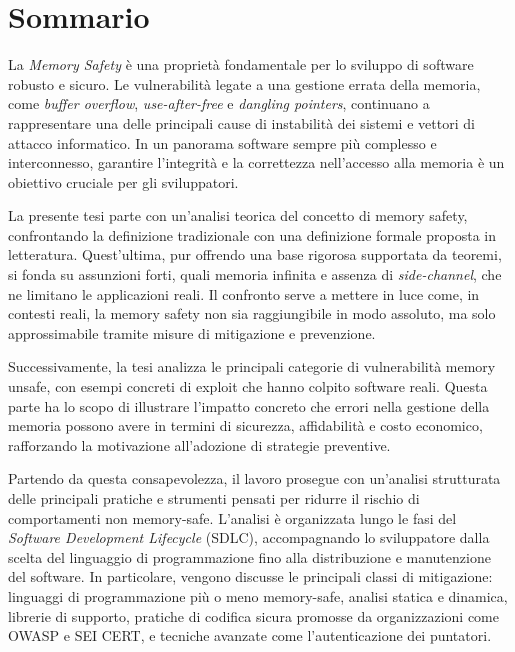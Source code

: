 \chapter*{Sommario}
\label{cha:sommario}

\vspace{0.5em}

La \textit{Memory Safety} è una proprietà fondamentale per lo sviluppo di software
robusto e sicuro. Le vulnerabilità legate a una gestione errata della memoria, come
\textit{buffer overflow}, \textit{use-after-free} e \textit{dangling pointers},
continuano a rappresentare una delle principali cause di instabilità dei sistemi
e vettori di attacco informatico. In un panorama software sempre più complesso e
interconnesso, garantire l'integrità e la correttezza nell'accesso alla memoria
è un obiettivo cruciale per gli sviluppatori.

\vspace{0.25em}

La presente tesi parte con un'analisi teorica del concetto di memory safety,
confrontando la definizione tradizionale con una definizione formale proposta in
letteratura. Quest'ultima, pur offrendo una base rigorosa supportata da teoremi,
si fonda su assunzioni forti, quali memoria infinita e assenza di \textit{side-channel},
che ne limitano le applicazioni reali. Il confronto serve a mettere in luce come,
in contesti reali, la memory safety non sia raggiungibile in modo assoluto, ma solo
approssimabile tramite misure di mitigazione e prevenzione.

\vspace{0.25em}

Successivamente, la tesi analizza le principali categorie di vulnerabilità
memory unsafe, con esempi concreti di exploit che hanno colpito software reali.
Questa parte ha lo scopo di illustrare l'impatto concreto che errori nella
gestione della memoria possono avere in termini di sicurezza, affidabilità e costo
economico, rafforzando la motivazione all'adozione di strategie preventive.

\vspace{0.25em}

Partendo da questa consapevolezza, il lavoro prosegue con un'analisi strutturata
delle principali pratiche e strumenti pensati per ridurre il rischio di
comportamenti non memory-safe. L'analisi è organizzata lungo le fasi del \textit{Software
Development Lifecycle} (SDLC), accompagnando lo sviluppatore dalla scelta del linguaggio
di programmazione fino alla distribuzione e manutenzione del software. In
particolare, vengono discusse le principali classi di mitigazione: linguaggi di
programmazione più o meno memory-safe, analisi statica e dinamica, librerie di
supporto, pratiche di codifica sicura promosse da organizzazioni come \textsc{OWASP}
e \textsc{SEI CERT}, e tecniche avanzate come l'autenticazione dei puntatori.

